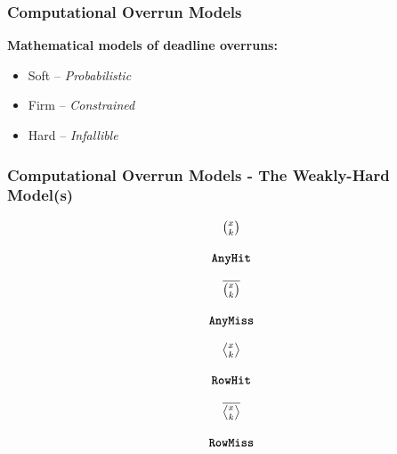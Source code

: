 \begin{frame}
    \frametitle{Computational Overrun Models}
    \textbf{Mathematical models of deadline overruns:}
    \begin{itemize}
        \item Soft -- \emph{Probabilistic}~\cite{Buttazzo:2005, Manolache:2004, vonderBrueggen:2021}
        \item \alert<2>{Firm -- \emph{Constrained}~\cite{Koren:1995, Bernat:2001}}
        \item Hard -- \emph{Infallible}~\cite{Liu:1973}
    \end{itemize}
\end{frame}

\begin{frame}
    \frametitle{Computational Overrun Models - The Weakly-Hard Model(s)}
    \begin{minipage}[c]{0.24\textwidth}
        \centering
        \begin{equation*}
            \begin{matrix}
                {\Large \binom{x_{}}{k_{}}}   \\
                            \\
                \texttt{\textbf{AnyHit}}{}
            \end{matrix}
        \end{equation*}
    \end{minipage}\hfill
    \begin{minipage}[c]{0.24\textwidth}
        \centering
        \begin{equation*}
            \begin{matrix}
                {\Large \overline{\binom{x_{}}{k_{}}}}   \\
                            \\
                \texttt{\textbf{AnyMiss}}{}
            \end{matrix}
        \end{equation*}
    \end{minipage}\hfill
    \begin{minipage}[c]{0.24\textwidth}
        \centering
        \begin{equation*}
            \begin{matrix}
                {\Large \rowhit{}}   \\
                            \\
                \tRH{}
            \end{matrix}
        \end{equation*}
    \end{minipage}\hfill
    \begin{minipage}[c]{0.24\textwidth}
        \centering
        \begin{equation*}
            \begin{matrix}
                {\Large \rowmiss{}}   \\
                            \\
                \tRM{}
            \end{matrix}
        \end{equation*}
    \end{minipage}


\end{frame}
